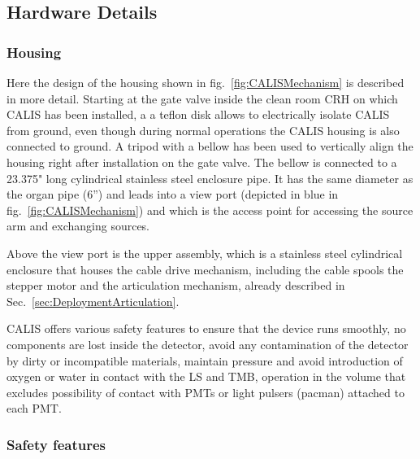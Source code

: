 \subsection{Hardware Details}

\subsubsection{Housing}

Here the design of the housing shown in fig.~\ref{fig:CALISMechanism} is described in more detail. Starting at the gate valve inside the clean room CRH on which CALIS has been installed, a a teflon disk allows to electrically isolate CALIS from ground, even though during normal operations the CALIS housing is also connected to ground. A tripod with a bellow has been used to vertically align the housing right after installation on the gate valve. The bellow is connected to a 23.375" long cylindrical stainless steel enclosure pipe. It has the same diameter as the organ pipe (6'') and leads into a view port (depicted in blue in fig.~\ref{fig:CALISMechanism}) and which is the access point for accessing the source arm and exchanging sources.  

Above the view port is the upper assembly, which is a stainless steel cylindrical enclosure that houses the cable drive mechanism, including the cable spools the stepper motor and the articulation mechanism, already described in Sec.~\ref{sec:DeploymentArticulation}. 

CALIS offers various safety features to ensure that the device runs smoothly, no components are lost inside the detector, avoid any contamination of the detector by dirty or incompatible materials, maintain pressure and avoid introduction of oxygen or water in contact with the LS and TMB, operation in the volume that excludes possibility of contact with PMTs or light pulsers (pacman) attached to each PMT.
 
\subsubsection{Safety features}

